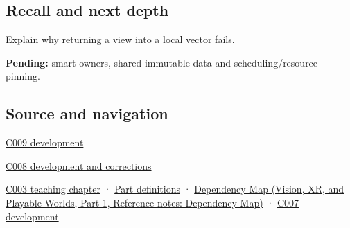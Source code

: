\subsection{Recall and next depth}\label{appendix-d52e4486f527-recall-and-next-depth}

\hypertarget{appendix-d52e4486f527-recall-and-next-depth}{}

Explain why returning a view into a local vector fails.

\textbf{Pending:} smart owners, shared immutable data and scheduling/resource pinning.

\subsection{Source and navigation}\label{appendix-d52e4486f527-source-and-navigation}

\hypertarget{appendix-d52e4486f527-source-and-navigation}{}

\hyperref[appendix-fd090d982a15-m009---parts-127-147]{C009 development}

\hyperref[appendix-fd090d982a15-m008---parts-113-126]{C008 development and corrections}

\hyperref[01-foundations-i-ch002-where-the-bytes-live]{C003 teaching chapter} · \hyperref[appendix-fd090d982a15-m003---parts-41-60]{Part definitions} · \href{../07-Vision-XR-and-Playable-Worlds-P01/main.pdf\#nameddest=appendix-4ad47bdd269a}{Dependency Map (Vision, XR, and Playable Worlds, Part 1, Reference notes: Dependency Map)} · \hyperref[01-foundations-i-ch003-bringing-the-object-model-back-to-bytes]{C007 development}
